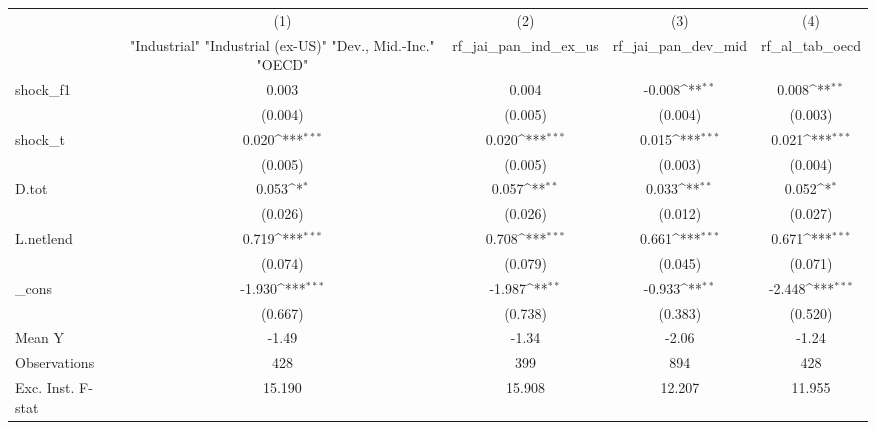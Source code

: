 {
\def\sym#1{\ifmmode^{#1}\else\(^{#1}\)\fi}
\begin{tabular}{l*{4}{c}}
\toprule
            &\multicolumn{1}{c}{(1)}&\multicolumn{1}{c}{(2)}&\multicolumn{1}{c}{(3)}&\multicolumn{1}{c}{(4)}\\
            &\multicolumn{1}{c}{ "Industrial" "Industrial (ex-US)" "Dev., Mid.-Inc." "OECD" }&\multicolumn{1}{c}{rf\_jai\_pan\_ind\_ex\_us}&\multicolumn{1}{c}{rf\_jai\_pan\_dev\_mid}&\multicolumn{1}{c}{rf\_al\_tab\_oecd}\\
\midrule
shock\_f1    &       0.003         &       0.004         &      -0.008\sym{**} &       0.008\sym{**} \\
            &     (0.004)         &     (0.005)         &     (0.004)         &     (0.003)         \\
\addlinespace
shock\_t     &       0.020\sym{***}&       0.020\sym{***}&       0.015\sym{***}&       0.021\sym{***}\\
            &     (0.005)         &     (0.005)         &     (0.003)         &     (0.004)         \\
\addlinespace
D.tot       &       0.053\sym{*}  &       0.057\sym{**} &       0.033\sym{**} &       0.052\sym{*}  \\
            &     (0.026)         &     (0.026)         &     (0.012)         &     (0.027)         \\
\addlinespace
L.netlend   &       0.719\sym{***}&       0.708\sym{***}&       0.661\sym{***}&       0.671\sym{***}\\
            &     (0.074)         &     (0.079)         &     (0.045)         &     (0.071)         \\
\addlinespace
\_cons      &      -1.930\sym{***}&      -1.987\sym{**} &      -0.933\sym{**} &      -2.448\sym{***}\\
            &     (0.667)         &     (0.738)         &     (0.383)         &     (0.520)         \\
\midrule
Mean Y      &       -1.49         &       -1.34         &       -2.06         &       -1.24         \\
Observations&         428         &         399         &         894         &         428         \\
Exc. Inst. F-stat&      15.190         &      15.908         &      12.207         &      11.955         \\
\bottomrule
\end{tabular}
}
